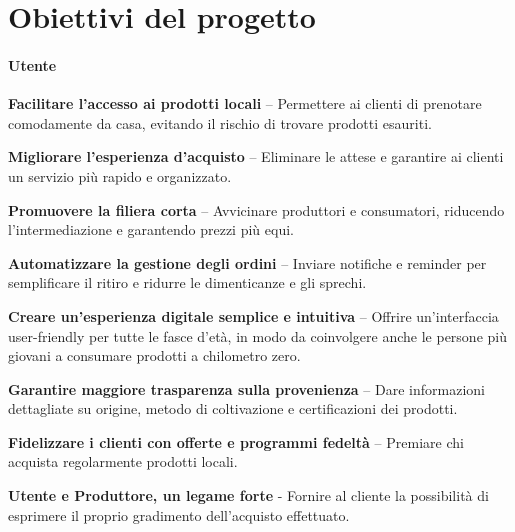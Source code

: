 \section{Obiettivi del progetto}

\paragraph{Utente}


\begin{objitem}
    \item \textbf{Facilitare l'accesso ai prodotti locali} – Permettere ai clienti di prenotare comodamente da casa, evitando il rischio di trovare prodotti esauriti.
    \item  \textbf{Migliorare l'esperienza d'acquisto} – Eliminare le attese e garantire ai clienti un servizio più rapido e organizzato.
    \item  \textbf{Promuovere la filiera corta} – Avvicinare produttori e consumatori, riducendo l'intermediazione e garantendo prezzi più equi.
    \item  \textbf{Automatizzare la gestione degli ordini} – Inviare notifiche e reminder per semplificare il ritiro e ridurre le dimenticanze e gli sprechi.
    \item  \textbf{Creare un'esperienza digitale semplice e intuitiva} – Offrire un'interfaccia user-friendly per tutte le fasce d'età, in modo da coinvolgere anche le persone più giovani a consumare prodotti a chilometro zero.
    \item  \textbf{Garantire maggiore trasparenza sulla provenienza} – Dare informazioni dettagliate su origine, metodo di coltivazione e certificazioni dei prodotti.
    \item  \textbf{Fidelizzare i clienti con offerte e programmi fedeltà} – Premiare chi acquista regolarmente prodotti locali.
    \item \textbf{Utente e Produttore, un legame forte} - Fornire al cliente la possibilità di esprimere il proprio gradimento dell'acquisto effettuato.
\end{objitem}
    
